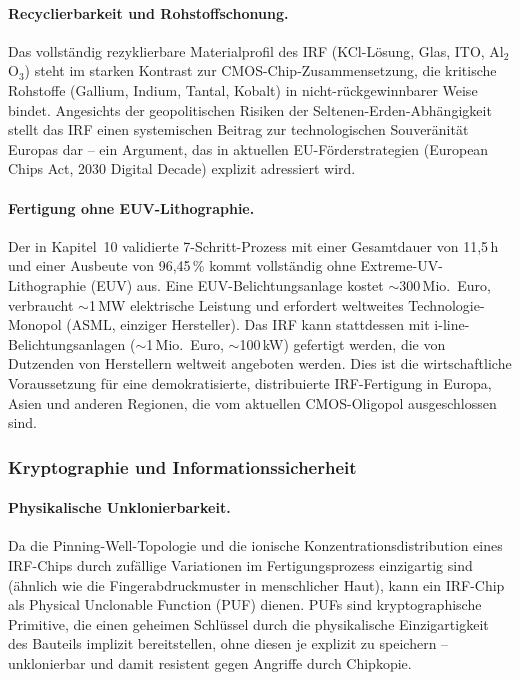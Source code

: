 ﻿\documentclass[a4paper,12pt]{scrreprt}
\theoremstyle{definition}
\begin{document}
\paragraph{Recyclierbarkeit und Rohstoffschonung.}
Das vollständig rezyklierbare Materialprofil des IRF (KCl-Lösung,
Glas, ITO, Al$_2$O$_3$) steht im starken Kontrast zur
CMOS-Chip-Zusammensetzung, die kritische Rohstoffe (Gallium, Indium,
Tantal, Kobalt) in nicht-rückgewinnbarer Weise bindet. Angesichts
der geopolitischen Risiken der Seltenen-Erden-Abhängigkeit stellt
das IRF einen systemischen Beitrag zur technologischen Souveränität
Europas dar -- ein Argument, das in aktuellen EU-Förderstrategien
(European Chips Act, 2030 Digital Decade) explizit adressiert wird.

\paragraph{Fertigung ohne EUV-Lithographie.}
Der in Kapitel~10 validierte 7-Schritt-Prozess mit einer Gesamtdauer
von 11,5\,h und einer Ausbeute von 96,45\,\% kommt vollständig ohne
Extreme-UV-Lithographie (EUV) aus. Eine EUV-Belichtungsanlage kostet
$\sim$300\,Mio.\ Euro, verbraucht $\sim$1\,MW elektrische Leistung
und erfordert weltweites Technologie-Monopol (ASML, einziger Hersteller).
Das IRF kann stattdessen mit i-line-Belichtungsanlagen ($\sim$1\,Mio.\ Euro,
$\sim$100\,kW) gefertigt werden, die von Dutzenden von Herstellern
weltweit angeboten werden. Dies ist die wirtschaftliche Voraussetzung
für eine demokratisierte, distribuierte IRF-Fertigung in Europa, Asien
und anderen Regionen, die vom aktuellen CMOS-Oligopol ausgeschlossen sind.

\subsubsection{Kryptographie und Informationssicherheit}
\label{subsubsec:kryptographie}

\paragraph{Physikalische Unklonierbarkeit.}
Da die Pinning-Well-Topologie und die ionische Konzentrationsdistribution
eines IRF-Chips durch zufällige Variationen im Fertigungsprozess
einzigartig sind (ähnlich wie die Fingerabdruckmuster in menschlicher
Haut), kann ein IRF-Chip als Physical Unclonable Function (PUF) dienen.
PUFs sind kryptographische Primitive, die einen geheimen Schlüssel durch
die physikalische Einzigartigkeit des Bauteils implizit bereitstellen,
ohne diesen je explizit zu speichern -- unklonierbar und damit resistent
gegen Angriffe durch Chipkopie.
\end{document}
